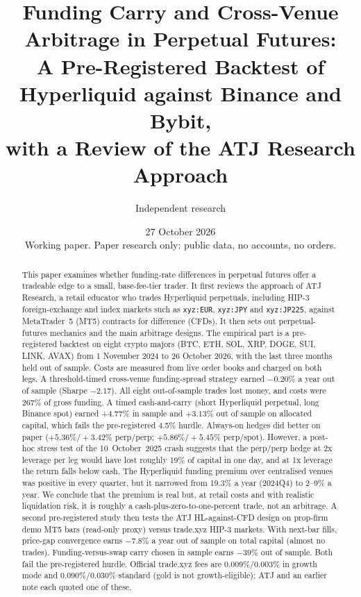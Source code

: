 \documentclass[11pt,a4paper]{article}
\title{\textbf{Funding Carry and Cross-Venue Arbitrage in Perpetual Futures:\\
A Pre-Registered Backtest of Hyperliquid against Binance and Bybit,\\ with a Review of the ATJ Research Approach}}
\author{Independent research}
\date{27 October 2026\\[4pt]\small Working paper. Paper research only: public data, no accounts, no orders.}
\begin{document}
\maketitle

\begin{abstract}
\noindent
This paper examines whether funding-rate differences in perpetual futures offer a tradeable edge to a small, base-fee-tier trader.
It first reviews the approach of ATJ Research, a retail educator who trades Hyperliquid perpetuals, including HIP-3 foreign-exchange and index markets such as \texttt{xyz:EUR}, \texttt{xyz:JPY} and \texttt{xyz:JP225}, against MetaTrader~5 (MT5) contracts for difference (CFDs). It then sets out perpetual-futures mechanics and the main arbitrage designs.
The empirical part is a pre-registered backtest on eight crypto majors (BTC, ETH, SOL, XRP, DOGE, SUI, LINK, AVAX) from 1 November 2024 to 26 October 2026, with the last three months held out of sample.
Costs are measured from live order books and charged on both legs.
A threshold-timed cross-venue funding-spread strategy earned $-0.20\%$ a year out of sample (Sharpe $-2.17$). All eight out-of-sample trades lost money, and costs were 267\% of gross funding.
A timed cash-and-carry (short Hyperliquid perpetual, long Binance spot) earned $+4.77\%$ in sample and $+3.13\%$ out of sample on allocated capital, which fails the pre-registered 4.5\% hurdle.
Always-on hedges did better on paper ($+5.36\%/+3.42\%$ perp/perp; $+5.86\%/+5.45\%$ perp/spot). However, a post-hoc stress test of the 10~October~2025 crash suggests that the perp/perp hedge at 2x leverage per leg would have lost roughly 19\% of capital in one day, and at 1x leverage the return falls below cash.
The Hyperliquid funding premium over centralised venues was positive in every quarter, but it narrowed from 19.3\% a year (2024Q4) to 2--9\% a year.
We conclude that the premium is real but, at retail costs and with realistic liquidation risk, it is roughly a cash-plus-zero-to-one-percent trade, not an arbitrage.
A second pre-registered study then tests the ATJ HL-against-CFD design on prop-firm demo MT5 bars (read-only proxy) versus trade.xyz HIP-3 markets. With next-bar fills, price-gap convergence earns $-7.8\%$ a year out of sample on total capital (almost no trades). Funding-versus-swap carry chosen in sample earns $-39\%$ out of sample. Both fail the pre-registered hurdle. Official trade.xyz fees are 0.009\%/0.003\% in growth mode and 0.090\%/0.030\% standard (gold is not growth-eligible); ATJ and an earlier note each quoted one of these.
\end{abstract}
\end{document}
